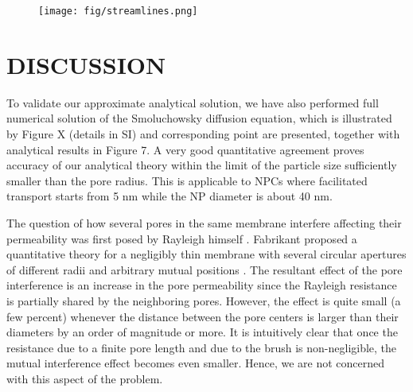 \documentclass[12pt, a4paper]{article}
\begin{document}
\begin{figure}
    \centering
    \texttt{[image: fig/streamlines.png]}
\end{figure}

\section{DISCUSSION}


To validate our approximate analytical solution, we have also performed full numerical solution of the Smoluchowsky diffusion equation, which is illustrated by Figure X 
(details in SI) and corresponding point are presented, together with analytical results in Figure 7. A very good quantitative agreement proves accuracy of our analytical theory
within the limit of the particle size sufficiently smaller than the pore radius. This is applicable to NPCs where facilitated transport starts from 5 nm while the
NP diameter is about 40 nm.

The question of how several pores in the same membrane interfere affecting their permeability was first posed by Rayleigh himself \cite{Strutt1878}. 
Fabrikant  proposed a quantitative theory for a negligibly thin membrane with several circular apertures of different radii and arbitrary mutual positions \cite{Fabrikant1985}. 
The resultant effect of the pore interference is an increase in the pore permeability since the Rayleigh resistance is partially shared by the neighboring pores. 
However, the effect is quite small (a few percent) whenever the distance between the pore centers is larger than their diameters by an order of magnitude or more. 
It is intuitively clear that once the resistance due to a finite pore length and due to the brush is non-negligible, the mutual interference effect 
becomes even smaller. Hence, we are not concerned with this aspect of the problem.

\end{document}
